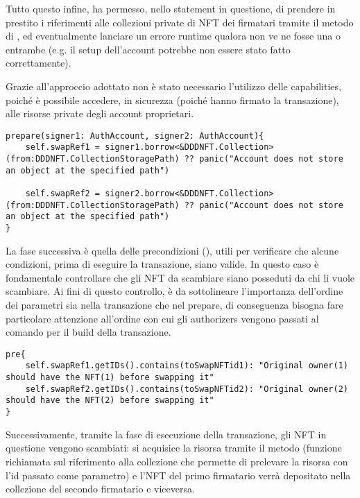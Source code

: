Tutto questo infine, ha permesso, nello statement in questione, di prendere in prestito i riferimenti alle collezioni private di NFT dei firmatari tramite il metodo  di , ed eventualmente lanciare un errore runtime qualora non ve ne fosse una o entrambe (e.g. il setup dell'account potrebbe non essere stato fatto correttamente). 

Grazie all'approccio adottato non è stato necessario l'utilizzo delle capabilities, poiché è possibile accedere, in sicurezza (poiché hanno firmato la transazione), alle risorse private degli account proprietari.

\begin{lstlisting}[style=all, style=cadence]
prepare(signer1: AuthAccount, signer2: AuthAccount){
    self.swapRef1 = signer1.borrow<&DDDNFT.Collection>(from:DDDNFT.CollectionStoragePath) ?? panic("Account does not store an object at the specified path")
    
    self.swapRef2 = signer2.borrow<&DDDNFT.Collection>(from:DDDNFT.CollectionStoragePath) ?? panic("Account does not store an object at the specified path")
}
\end{lstlisting}

La fase successiva è quella delle precondizioni (), utili per verificare che alcune condizioni, prima di eseguire la transazione, siano valide. In questo caso è fondamentale controllare che gli NFT da scambiare siano posseduti da chi li vuole scambiare. Ai fini di questo controllo, è da sottolineare l'importanza dell'ordine dei parametri sia nella transazione che nel prepare, di conseguenza bisogna fare particolare attenzione all'ordine con cui gli authorizers vengono passati al comando per il build della transazione.

\newpage
\begin{lstlisting}[style=all, style=cadence]
pre{
    self.swapRef1.getIDs().contains(toSwapNFTid1): "Original owner(1) should have the NFT(1) before swapping it"
    self.swapRef2.getIDs().contains(toSwapNFTid2): "Original owner(2) should have the NFT(2) before swapping it"
}
\end{lstlisting}

Successivamente, tramite la fase di esecuzione della transazione, gli NFT in questione vengono scambiati: si acquisice la risorsa tramite il metodo  (funzione richiamata sul riferimento alla collezione che permette di prelevare la risorsa con l'id passato come parametro) e l'NFT del primo firmatario verrà depositato nella collezione del secondo firmatario e viceversa.

